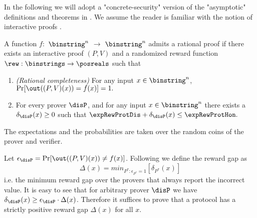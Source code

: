 
In the following we will adopt a "concrete-security" version of the "asymptotic" definitions and theorems in \cite{am1,rosen}. We assume the reader is familiar with the notion of interactive proofs \cite{gmr}. 

\noindent
\begin{definition}
\label{def:RP-delta}
\label{def:RP}
A function $f:$ $\binstring^n$ $\to$ $\binstring^n$ admits a rational proof if there exists an interactive proof $(P,V)$ and a randomized reward function
$\rew : \binstrings \to \posreals$ such that

\begin{enumerate}
\item \emph{(Rational completeness)} For any input $x \in 
\binstring^n$, $\Pr[\out((P,V)(x)) = f(x)] = 1.$

\item For every prover $\disP$, and for any input $x \in 
\binstring^n$ there exists a $\delta_{\disP}(x) \geq 0$ such that 
$ \expRewProtDis + \delta_{\disP}(x) \leq \expRewProtHon. $
\end{enumerate}
The expectations and the probabilities are taken over the random coins of the prover and verifier.
\end{definition} 

\noindent
Let $\epsilon_{\disP} = \Pr[\out((P,V)(x)) \neq f(x)]$. 
Following \cite{rosen} we define the {\sf reward gap} as 
\[ \Delta(x) = min_{P^* : \epsilon_{P^*}=1}[\delta_{P^*}(x)]  \]
i.e. the minimum reward gap over the provers that always report the incorrect value. 
It is easy to see that for arbitrary prover $\disP$ we have $\delta_{\disP}(x) \geq 
\epsilon_{\disP} \cdot \Delta(x)$. Therefore it suffices to prove that a protocol has 
a strictly positive reward gap $\Delta(x)$ for all $x$. 

